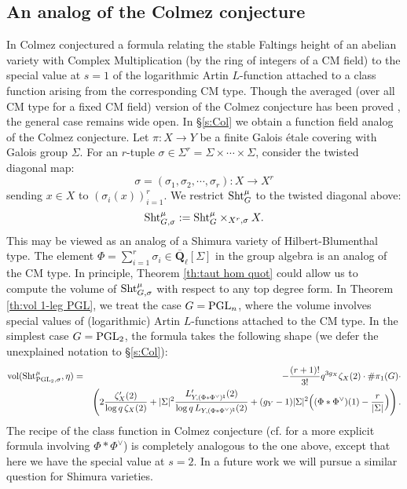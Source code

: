 \documentclass[reqno]{amsart}
\numberwithin{equation}{subsection}
\theoremstyle{definition}
\newcommand\Sht{\textup{Sht}}
\newcommand{\vol}{\textup{vol}}
\newcommand\PGL{\textup{PGL}}
\newcommand{\Qlbar}{\overline{\Q}_\ell}
\newcommand{\s}{\sigma}
\newcommand{\z}{\zeta}
\newcommand{\Sig}{\Sigma}
\newcommand{\Q}{\mathbf{Q}}
\begin{document}
\subsection{An analog of the Colmez conjecture}
In \cite{Col1} Colmez conjectured a formula relating the stable Faltings height of an abelian variety with Complex Multiplication (by the ring of integers of a CM field) to the special value at $s=1$ of the logarithmic Artin $L$-function attached to a class function arising from the corresponding CM type. Though the averaged (over all CM type for a fixed CM field) version of the Colmez conjecture has been proved \cite{AGHMP,YZ18}, the general case remains wide open. In \S\ref{s:Col} we obtain a function field analog of the Colmez conjecture. 
Let $\pi: X\to Y$ be a finite Galois \'etale covering with Galois group $\Sig$.
For an $r$-tuple $\s\in\Sig^r= \Sig\times\cdots\times \Sig$, consider the twisted diagonal map: 
\begin{equation*}
  \s= (\s_1,\s_2,\cdots,\s_r): X \to X^r
\end{equation*}
sending $x\in X$ to $(\s_i(x))_{i=1}^r$. We restrict $\Sht^\mu_G$ to the twisted diagonal above:
\begin{equation*}
    \Sht^\mu_{G,\s}:=\Sht^\mu_G\times_{X^r,\s}X.
\end{equation*} 
This may be viewed as an analog of a Shimura variety of Hilbert-Blumenthal type. The element  $\Phi=\sum_{i=1}^r\s_i\in \Qlbar[\Sig]$ in  the group algebra is an analog of the CM type. 
In principle, Theorem  \ref{th:taut hom quot} could allow us to compute the volume of $ \Sht^\mu_{G, \s}$ with respect to any top degree form. In Theorem \ref{th:vol 1-leg PGL}, we treat the case $G=\PGL_n$,  where the volume involves special values of (logarithmic) Artin $L$-functions attached to the CM type. In the simplest case $G=\PGL_2$, the formula takes the following shape (we defer the unexplained notation to \S\ref{s:Col}):
  \begin{eqnarray*}
    \vol(\Sht^\mu_{\PGL_2,\s}, \eta) &=&-\frac{(r+1)!}{3!}q^{3g_X} \z_X(2) \cdot \# \pi_1(G) \cdot  \\ 
   && \left( 2\frac{\z'_X(2)}{\log q\,\z_X(2)}
   +  |\Sig|^2 \frac{L'_{Y, (\Phi\ast \Phi^\vee)^\natural}(2)}{\log q\, L_{Y, (\Phi\ast \Phi^\vee)^\natural}(2)} 
   +(g_Y-1)|\Sig|^2\Big((\Phi\ast\Phi^\vee)(1)-\frac{r}{|\Sig|}\Big)\right).
   \end{eqnarray*}
The recipe of the class function in Colmez conjecture (cf. \cite[\S2]{Col2} for a more explicit formula involving $\Phi\ast\Phi^\vee$) is completely analogous to the one above, except that here we have the special value at $s=2$. 
In a future work we will pursue a similar question for Shimura varieties.
   
\end{document}
